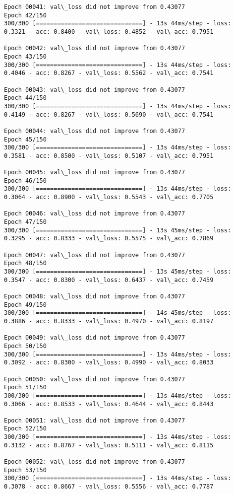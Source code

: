\documentclass[11pt]{article}
\begin{document}
\begin{Verbatim}[commandchars=\\\{\}]
Epoch 00041: val\_loss did not improve from 0.43077
Epoch 42/150
300/300 [==============================] - 13s 44ms/step - loss: 0.3321 - acc: 0.8400 - val\_loss: 0.4852 - val\_acc: 0.7951

Epoch 00042: val\_loss did not improve from 0.43077
Epoch 43/150
300/300 [==============================] - 13s 44ms/step - loss: 0.4046 - acc: 0.8267 - val\_loss: 0.5562 - val\_acc: 0.7541

Epoch 00043: val\_loss did not improve from 0.43077
Epoch 44/150
300/300 [==============================] - 13s 44ms/step - loss: 0.4149 - acc: 0.8267 - val\_loss: 0.5690 - val\_acc: 0.7541

Epoch 00044: val\_loss did not improve from 0.43077
Epoch 45/150
300/300 [==============================] - 13s 44ms/step - loss: 0.3581 - acc: 0.8500 - val\_loss: 0.5107 - val\_acc: 0.7951

Epoch 00045: val\_loss did not improve from 0.43077
Epoch 46/150
300/300 [==============================] - 13s 44ms/step - loss: 0.3064 - acc: 0.8900 - val\_loss: 0.5543 - val\_acc: 0.7705

Epoch 00046: val\_loss did not improve from 0.43077
Epoch 47/150
300/300 [==============================] - 13s 45ms/step - loss: 0.3295 - acc: 0.8333 - val\_loss: 0.5575 - val\_acc: 0.7869

Epoch 00047: val\_loss did not improve from 0.43077
Epoch 48/150
300/300 [==============================] - 13s 45ms/step - loss: 0.3547 - acc: 0.8300 - val\_loss: 0.6437 - val\_acc: 0.7459

Epoch 00048: val\_loss did not improve from 0.43077
Epoch 49/150
300/300 [==============================] - 14s 45ms/step - loss: 0.3886 - acc: 0.8333 - val\_loss: 0.4970 - val\_acc: 0.8197

Epoch 00049: val\_loss did not improve from 0.43077
Epoch 50/150
300/300 [==============================] - 13s 44ms/step - loss: 0.3092 - acc: 0.8300 - val\_loss: 0.4990 - val\_acc: 0.8033

Epoch 00050: val\_loss did not improve from 0.43077
Epoch 51/150
300/300 [==============================] - 13s 44ms/step - loss: 0.3066 - acc: 0.8533 - val\_loss: 0.4644 - val\_acc: 0.8443

Epoch 00051: val\_loss did not improve from 0.43077
Epoch 52/150
300/300 [==============================] - 13s 44ms/step - loss: 0.3132 - acc: 0.8767 - val\_loss: 0.5111 - val\_acc: 0.8115

Epoch 00052: val\_loss did not improve from 0.43077
Epoch 53/150
300/300 [==============================] - 13s 44ms/step - loss: 0.3078 - acc: 0.8667 - val\_loss: 0.5556 - val\_acc: 0.7787


\end{Verbatim}
\end{document}
